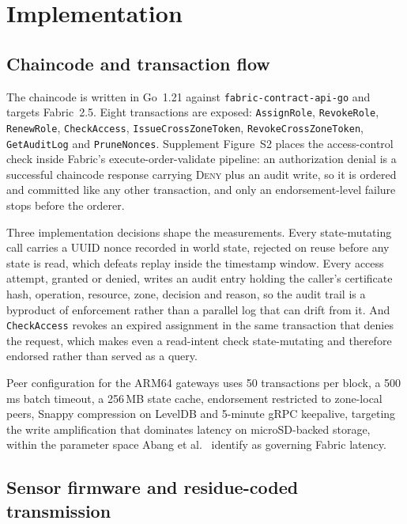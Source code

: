 \documentclass[a4paper,fleqn]{cas-dc}
\begin{document}
\FloatBarrier
\section{Implementation}
\label{sec:impl}

\subsection{Chaincode and transaction flow}
\label{subsec:chaincode}

The chaincode is written in Go~1.21 against \texttt{fabric-contract-api-go}
and targets Fabric~2.5. Eight transactions are exposed: \texttt{AssignRole},
\texttt{RevokeRole}, \texttt{RenewRole}, \texttt{CheckAccess},
\texttt{IssueCrossZoneToken}, \texttt{RevokeCrossZoneToken},
\texttt{GetAuditLog} and \texttt{PruneNonces}. Supplement Figure~S2 places
the access-control check inside Fabric's execute-order-validate pipeline: an
authorization denial is a successful chaincode response carrying
\textsc{Deny} plus an audit write, so it is ordered and committed like any
other transaction, and only an endorsement-level failure stops before the
orderer.

Three implementation decisions shape the measurements. Every state-mutating
call carries a UUID nonce recorded in world state, rejected on reuse before
any state is read, which defeats replay inside the timestamp window. Every
access attempt, granted or denied, writes an audit entry holding the caller's
certificate hash, operation, resource, zone, decision and reason, so the
audit trail is a byproduct of enforcement rather than a parallel log that can
drift from it. And \texttt{CheckAccess} revokes an expired assignment in the
same transaction that denies the request, which makes even a read-intent
check state-mutating and therefore endorsed rather than served as a query.

Peer configuration for the ARM64 gateways uses 50 transactions per block, a
500\,ms batch timeout, a 256\,MB state cache, endorsement restricted to
zone-local peers, Snappy compression on LevelDB and 5-minute gRPC keepalive,
targeting the write amplification that dominates latency on microSD-backed
storage, within the parameter space Abang et al.\ \cite{abang2024latency}
identify as governing Fabric latency.

\subsection{Sensor firmware and residue-coded transmission}
\label{subsec:firmware}
\end{document}
